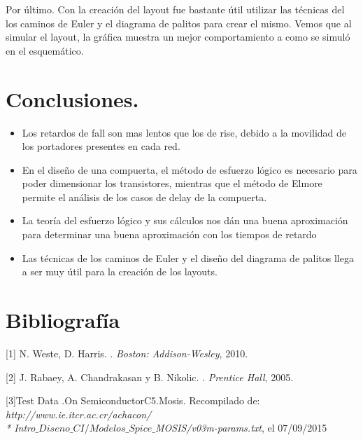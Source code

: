 \documentclass[12pt,a4paper]{article} %
\begin{document}
Por último. Con la creación del layout fue bastante útil utilizar las técnicas del los caminos de Euler y el diagrama de palitos para crear el mismo. Vemos que al simular el layout, la gráfica muestra un mejor comportamiento a como se simuló en el esquemático.




\section{Conclusiones.}
\begin{itemize}
\item Los retardos de fall son mas lentos que los de rise, debido a la movilidad de los portadores presentes en cada red.
\item En el diseño de una compuerta, el método de esfuerzo lógico es necesario para poder dimensionar los transistores, mientras que el método de Elmore permite el análisis de los casos de delay de la compuerta.
\item La teoría del esfuerzo lógico y sus cálculos nos dán una buena aproximación para determinar una buena aproximación con los tiempos de retardo
\item Las técnicas de los caminos de Euler y el diseño del diagrama de palitos llega a ser muy útil para la creación de los layouts.

\end{itemize}

\section{Bibliografía}
\begin{thebibliography}{3}


[1] N. Weste, D. Harris. 
.
\newblock \emph{Boston: Addison-Wesley}, 2010.

[2] J. Rabaey, A. Chandrakasan y B. Nikolic. 
.
\newblock \emph{Prentice Hall}, 2005.

[3]Test Data .On SemiconductorC5.Mosis. Recompilado de:
\newblock \emph{http://www.ie.itcr.ac.cr/achacon/ \\* Intro$\_Diseno\_CI/Modelos\_Spice\_$MOSIS/v03m-params.txt}, el 07/09/2015

\end{thebibliography}
\end{document}
